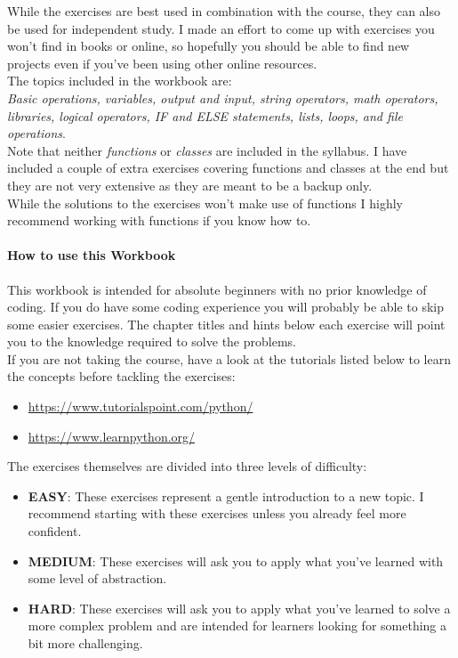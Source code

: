 \documentclass[
  12pt,					%
  a4paper,				%
  twoside,				%
]{report}
\begin{document}
While the exercises are best used in combination with the course, they can also be used for independent study. I made an effort to come up with exercises you won't find in books or online, so hopefully you should be able to find new projects even if you've been using other online resources.\\

The topics included in the workbook are:\\
\textit{Basic operations, variables, output and input, string operators, math operators, libraries, logical operators, IF and ELSE statements, lists, loops, and file operations}.\\
Note that neither \textit{functions} or \textit{classes} are included in the syllabus. I have included a couple of extra exercises covering functions and classes at the end but they are not very extensive as they are meant to be a backup only.\\
While the solutions to the exercises won't make use of functions I highly recommend working with functions if you know how to.

\paragraph{How to use this Workbook}
This workbook is intended for absolute beginners with no prior knowledge of coding. If you do have some coding experience you will probably be able to skip some easier exercises. The chapter titles and hints below each exercise will point you to the knowledge required to solve the problems.\\
If you are not taking the course, have a look at the tutorials listed below to learn the concepts before tackling the exercises:
\begin{itemize}
    \item \url{https://www.tutorialspoint.com/python/}
    \item \url{https://www.learnpython.org/}
\end{itemize}
The exercises themselves are divided into three  levels of difficulty:

\begin{itemize}
    \item \textbf{EASY}: These exercises represent a gentle introduction to a new topic. I recommend starting with these exercises unless you already feel more confident.
    \item \textbf{MEDIUM}: These exercises will ask you to apply what you've learned with some level of abstraction.
    \item \textbf{HARD}: These exercises will ask you to apply what you've learned to solve a more complex problem and are intended for learners looking for something a bit more challenging.
\end{itemize}
\end{document}
